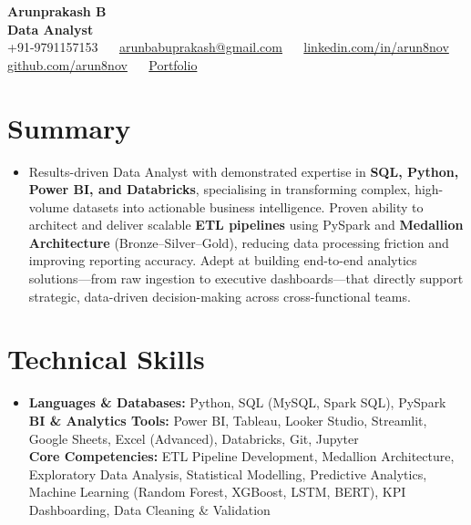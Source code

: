 \documentclass[letterpaper,10pt]{article}
\begin{document}
\begin{center}
  {\huge\textbf{Arunprakash B}}\\[4pt]
  {\large\color{airforceblue}\textbf{Data Analyst}}\\[5pt]
  \small
  +91-9791157153 ~\textbar~
  \href{mailto:arunbabuprakash@gmail.com}{arunbabuprakash@gmail.com} ~\textbar~
  \href{https://www.linkedin.com/in/arun8nov}{linkedin.com/in/arun8nov} ~\textbar~
  \href{https://github.com/arun8nov}{github.com/arun8nov} ~\textbar~
  \href{https://arun8nov.notion.site/Hey-there-I-am-Arunprakash-B-223fe4a17f8a80faa5abee1f246a06f1}{Portfolio}
\end{center}
\vspace{-10pt}

\section{Summary}
\begin{itemize}[leftmargin=0in, label={}]
  \item\normalsize{
    Results-driven Data Analyst with demonstrated expertise in \textbf{SQL, Python, Power BI, and Databricks}, specialising in transforming complex, high-volume datasets into actionable business intelligence. Proven ability to architect and deliver scalable \textbf{ETL pipelines} using PySpark and \textbf{Medallion Architecture} (Bronze--Silver--Gold), reducing data processing friction and improving reporting accuracy. Adept at building end-to-end analytics solutions---from raw ingestion to executive dashboards---that directly support strategic, data-driven decision-making across cross-functional teams.
  }
\end{itemize}
\vspace{-14pt}

\section{Technical Skills}
\begin{itemize}[leftmargin=0in, label={}]
  \small\item{
    \textbf{Languages \& Databases:} Python, SQL (MySQL, Spark SQL), PySpark \\[1pt]
    \textbf{BI \& Analytics Tools:} Power BI, Tableau, Looker Studio, Streamlit, Google Sheets, Excel (Advanced), Databricks, Git, Jupyter \\[1pt]
    \textbf{Core Competencies:} ETL Pipeline Development, Medallion Architecture, Exploratory Data Analysis, Statistical Modelling, Predictive Analytics, Machine Learning (Random Forest, XGBoost, LSTM, BERT), KPI Dashboarding, Data Cleaning \& Validation
  }
\end{itemize}
\vspace{-14pt}
\end{document}
